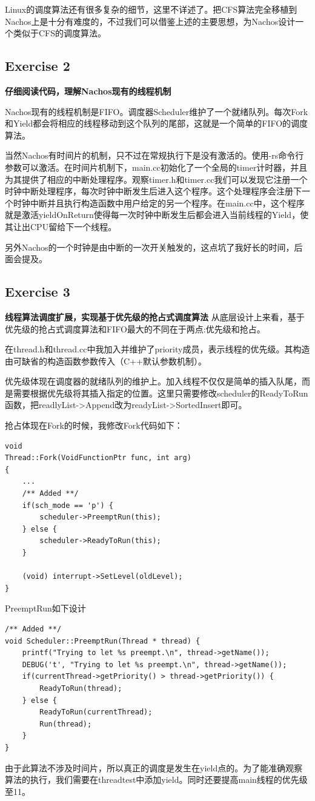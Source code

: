 \documentclass{ctexart}
\begin{document}
Linux的调度算法还有很多复杂的细节，这里不详述了。把CFS算法完全移植到Nachos上是十分有难度的，不过我们可以借鉴上述的主要思想，为Nachos设计一个类似于CFS的调度算法。

\subsection*{Exercise 2}
\textbf{仔细阅读代码，理解Nachos现有的线程机制}

Nachos现有的线程机制是FIFO。调度器Scheduler维护了一个就绪队列。每次Fork和Yield都会将相应的线程移动到这个队列的尾部，这就是一个简单的FIFO的调度算法。

当然Nachos有时间片的机制，只不过在常规执行下是没有激活的。使用-rs命令行参数可以激活。在时间片机制下，main.cc初始化了一个全局的timer计时器，并且为其提供了相应的中断处理程序。观察timer.h和timer.cc我们可以发现它注册一个时钟中断处理程序，每次时钟中断发生后进入这个程序。这个处理程序会注册下一个时钟中断并且执行构造函数中用户给定的另一个程序。在main.cc中，这个程序就是激活yieldOnReturn使得每一次时钟中断发生后都会进入当前线程的Yield，使其让出CPU留给下一个线程。

另外Nachos的一个时钟是由中断的一次开关触发的，这点坑了我好长的时间，后面会提及。

\subsection*{Exercise 3}
\textbf{线程算法调度扩展，实现基于优先级的抢占式调度算法}
从底层设计上来看，基于优先级的抢占式调度算法和FIFO最大的不同在于两点:优先级和抢占。

在thread.h和thread.cc中我加入并维护了priority成员，表示线程的优先级。其构造由可缺省的构造函数参数传入（C++默认参数机制）。

优先级体现在调度器的就绪队列的维护上。加入线程不仅仅是简单的插入队尾，而是需要根据优先级将其插入指定的位置。这里只需要修改scheduler的ReadyToRun函数，把readlyList->Append改为readyList->SortedInsert即可。

抢占体现在Fork的时候，我修改Fork代码如下：
\begin{lstlisting}
void 
Thread::Fork(VoidFunctionPtr func, int arg)
{
	...
    /** Added **/
    if(sch_mode == 'p') {
        scheduler->PreemptRun(this);
    } else {
        scheduler->ReadyToRun(this);
    }
    
    (void) interrupt->SetLevel(oldLevel);
}   
\end{lstlisting}
PreemptRun如下设计
\begin{lstlisting}
/** Added **/
void Scheduler::PreemptRun(Thread * thread) {
    printf("Trying to let %s preempt.\n", thread->getName());
    DEBUG('t', "Trying to let %s preempt.\n", thread->getName());
    if(currentThread->getPriority() > thread->getPriority()) {
        ReadyToRun(thread);
    } else {
        ReadyToRun(currentThread);
        Run(thread);
    }
}
\end{lstlisting}
由于此算法不涉及时间片，所以真正的调度是发生在yield点的。为了能准确观察算法的执行，我们需要在threadtest中添加yield。同时还要提高main线程的优先级至11。
\end{document}
